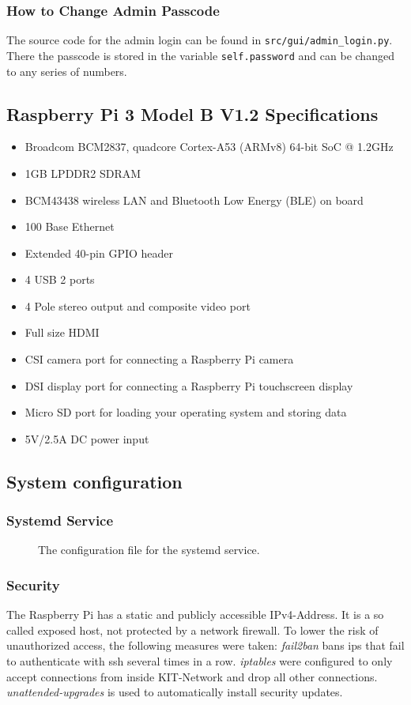 \documentclass[12pt]{article}
\begin{document}
\subsubsection{How to Change Admin Passcode}
The source code for the admin login can be found in \texttt{src/gui/admin\_login.py}.
There the passcode is stored in the variable \texttt{self.password} and can be changed to any series of numbers.

\subsection{Raspberry Pi 3 Model B V1.2 Specifications}
\label{PI:Spec}
\begin{itemize}
  \item Broadcom BCM2837, quadcore Cortex-A53 (ARMv8) 64-bit SoC @ 1.2GHz
  \item 1GB LPDDR2 SDRAM
  \item BCM43438 wireless LAN and Bluetooth Low Energy (BLE) on board
  \item 100 Base Ethernet
  \item Extended 40-pin GPIO header
  \item 4 USB 2 ports
  \item 4 Pole stereo output and composite video port
  \item Full size HDMI
  \item CSI camera port for connecting a Raspberry Pi camera
  \item DSI display port for connecting a Raspberry Pi touchscreen display
  \item Micro SD port for loading your operating system and storing data
  \item 5V/2.5A DC power input
\end{itemize}

\subsection{System configuration}
\subsubsection{Systemd Service}
\label{systemd-service}
\begin{figure}[H]
  
  \caption{The configuration file for the systemd service.}
\end{figure}

\subsubsection{Security}
The Raspberry Pi has a static and publicly accessible IPv4-Address.
It is a so called exposed host, not protected by a network firewall.
To lower the risk of unauthorized access, the following measures were taken:
\textit{fail2ban} bans ips that fail to authenticate with ssh several times in a row.
\textit{iptables} were configured to only accept connections from inside KIT-Network and drop all other connections.
\textit{unattended-upgrades} is used to automatically install security updates.
\end{document}
